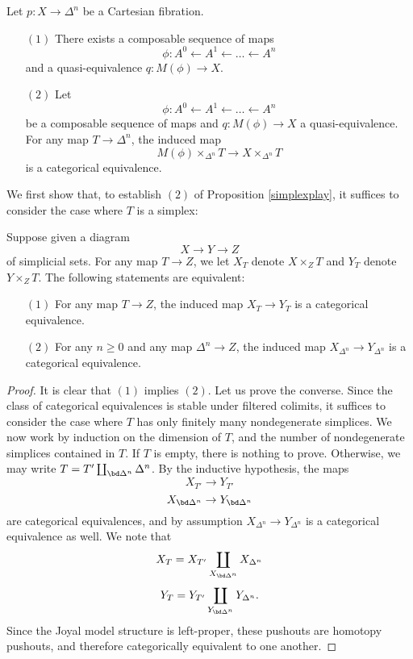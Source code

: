 \begin{proposition}\label{simplexplay}
Let $p: X \rightarrow \Delta^n$ be a Cartesian fibration. 
\begin{itemize}
\item[$(1)$] There exists a composable sequence of maps
$$ \phi: A^0 \leftarrow A^1 \leftarrow \ldots \leftarrow A^n $$
and a quasi-equivalence $q: M(\phi) \rightarrow X$.

\item[$(2)$] Let 
$$ \phi: A^0 \leftarrow A^1 \leftarrow \ldots \leftarrow A^n $$
be a composable sequence of maps and $q: M(\phi) \rightarrow X$ a quasi-equivalence.
For any map $T \rightarrow \Delta^n$, the induced map
$$ M(\phi) \times_{\Delta^n} T \rightarrow X \times_{\Delta^n} T$$
is a categorical equivalence.
\end{itemize}
\end{proposition}

We first show that, to establish $(2)$ of Proposition \ref{simplexplay}, it suffices to consider
the case where $T$ is a simplex:

\begin{proposition}\label{tulky}
Suppose given a diagram $$ X \rightarrow Y \rightarrow Z$$ of
simplicial sets. For any map $T \rightarrow Z$, we let $X_T$
denote $X \times_Z T$ and $Y_T$ denote $Y \times_Z T$. The
following statements are equivalent:
\begin{itemize}
\item[$(1)$] For any map $T \rightarrow Z$, the induced map $X_T
\rightarrow Y_T$ is a categorical equivalence.

\item[$(2)$] For any $n \geq 0$ and any map $\Delta^n \rightarrow Z$, the
induced map $X_{\Delta^n} \rightarrow Y_{\Delta^n}$ is a
categorical equivalence.
\end{itemize}

\end{proposition}

\begin{proof}
It is clear that $(1)$ implies $(2)$. Let us prove the converse.
Since the class of categorical equivalences is stable under
filtered colimits, it suffices to consider the case where $T$ has
only finitely many nondegenerate simplices. We now work by
induction on the dimension of $T$, and the number of nondegenerate
simplices contained in $T$. If $T$ is empty, there is nothing to
prove. Otherwise, we may write $T = T' \coprod_{\bd \Delta^n}
\Delta^n$. By the inductive hypothesis, the maps
$$ X_{T'} \rightarrow Y_{T'}$$
$$ X_{\bd \Delta^n} \rightarrow Y_{\bd \Delta^n}$$
are categorical equivalences, and by assumption $X_{\Delta^n}
\rightarrow Y_{\Delta^n}$ is a categorical equivalence as well. We
note that $$X_{T} = X_{T'} \coprod_{ X_{\bd \Delta^n} }
X_{\Delta^n}$$ $$Y_{T} = Y_{T'} \coprod_{ Y_{\bd \Delta^n} }
Y_{\Delta^n}.$$ Since the Joyal model structure is left-proper,
these pushouts are homotopy pushouts, and therefore categorically
equivalent to one another.
\end{proof}

